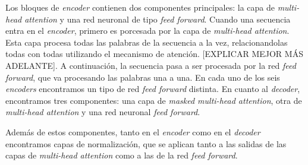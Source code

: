 \documentclass[11pt,spanish,listoffigures,listoftables]{tfgetsinf}
\begin{document}
Los bloques de \textit{encoder} contienen dos componentes principales:  la capa de \textit{multi-head attention} y una red neuronal de tipo \textit{feed forward}. Cuando una secuencia entra en el \textit{encoder}, primero es porcesada por la capa de \textit{multi-head attention}. Esta capa procesa todas las palabras de la secuencia a la vez, relacionandolas todas con todas utilizando el mecanismo de atención. [EXPLICAR MEJOR MÁS ADELANTE]. A continuación, la secuencia pasa a ser procesada por la red \textit{feed forward}, que va procesando las palabras una a una. En cada uno de los seis \textit{encoders} encontramos un tipo de red \textit{feed forward} distinta. En cuanto al \textit{decoder}, encontramos tres componentes: una capa de \textit{masked multi-head attention}, otra de \textit{multi-head attention} y una red neuronal \textit{feed forward}.

Además de estos componentes, tanto en el \textit{encoder} como en el \textit{decoder} encontramos capas de normalización, que se aplican tanto a las salidas de las capas de \textit{multi-head attention} como a las de la red \textit{feed forward}.
\end{document}
